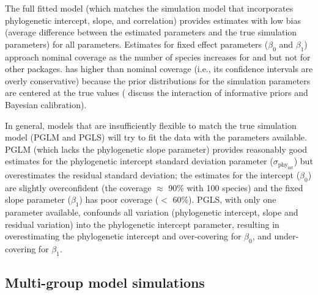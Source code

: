\documentclass[12pt]{article}
\begin{document}
The full fitted model (which matches the simulation model that incorporates phylogenetic intercept, slope, and correlation) provides estimates with low bias (average difference between the estimated parameters and the true simulation parameters) for all parameters. 
Estimates for fixed effect parameters ($\beta_0$ and $\beta_1$) approach nominal coverage as the number of species increases for  and  but not for other packages.  has higher than nominal coverage (i.e., its confidence intervals are overly conservative) because the prior distributions for the simulation parameters are centered at the true values (\citet{li2018fitting} discuss the interaction of informative priors and Bayesian calibration).

In general, models that are insufficiently flexible to match the true simulation model (PGLM and PGLS) will try to fit the data with the parameters available. 
PGLM (which lacks the phylogenetic slope parameter) provides reasonably good estimates for the phylogenetic intercept standard deviation parameter ($\sigma_{\mathrm{phy_{int}}}$) but overestimates the residual standard deviation; the estimates for the intercept ($\beta_0$) are slightly overconfident (the coverage $\approx$ 90\% with 100 species) and the fixed slope parameter ($\beta_1$) has poor coverage ($<$ 60\%).
PGLS, with only one parameter available, confounds all variation (phylogenetic intercept, slope and residual variation) into the phylogenetic intercept parameter, resulting in overestimating the phylogenetic intercept and over-covering for $\beta_0$, and under-covering for $\beta_1$.

\subsection*{Multi-group model simulations}
\end{document}
